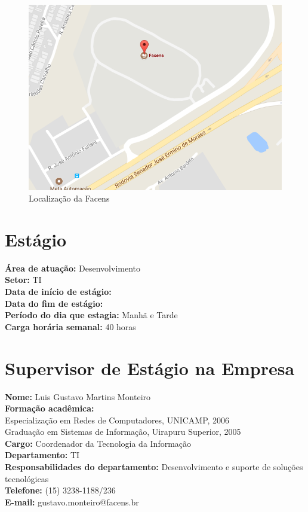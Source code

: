 \documentclass[
	12pt,				%
	oneside,			%
	a4paper,			%
	chapter=TITLE,		%
	section=TITLE,		%
	sumario=tradicional %
	english,			%
	french,				%
	spanish,			%
	brazil				%
	]{abntex2}
\begin{document}
\begin{figure}[htb]
\caption{\label{fig:mapsfacens} Localização da Facens}
\begin{center}
\includegraphics[scale=0.65]{MapsFacens}
\end{center}
\end{figure}

\section{Estágio}
\label{sec:estagio}
\textbf{Área de atuação:} Desenvolvimento \\
\indent \textbf{Setor:} TI \\
\indent \textbf{Data de início de estágio:} \\
\indent \textbf{Data do fim de estágio:} \\
\indent \textbf{Período do dia que estagia:} Manhã e Tarde \\
\indent \textbf{Carga horária semanal:} 40 horas \\

\section{Supervisor de Estágio na Empresa}
\label{sec:supestagioempre}
\textbf{Nome:} Luis Gustavo Martins Monteiro \\
\indent \textbf{Formação acadêmica:} \\
\indent \indent Especialização em Redes de Computadores, UNICAMP, 2006 \\
\indent \indent Graduação em Sistemas de Informação, Uirapuru Superior, 2005 \\
\indent \textbf{Cargo:} Coordenador da Tecnologia da Informação \\
\indent \textbf{Departamento:} TI \\
\indent \textbf{Responsabilidades do departamento:} Desenvolvimento e suporte de soluções tecnológicas \\
\indent \textbf{Telefone:} (15) 3238-1188/236 \\
\indent \textbf{E-mail:} gustavo.monteiro@facens.br \\
\end{document}

